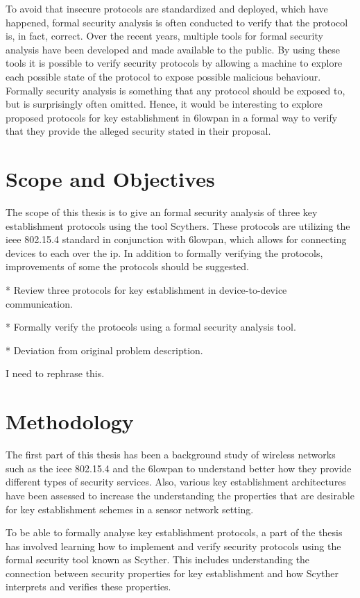 To avoid that insecure protocols are standardized and deployed, which have happened, formal security analysis is often conducted to verify that the protocol is, in fact, correct. Over the recent years, multiple tools for formal security analysis have been developed and made available to the public. By using these tools it is possible to verify security protocols by allowing a machine to explore each possible state of the protocol to expose possible malicious behaviour. Formally security analysis is something that any protocol should be exposed to, but is surprisingly often omitted. Hence, it would be interesting to explore proposed protocols for key establishment in \gls{6lowpan} in a formal way to verify that they provide the alleged security stated in their proposal.

\section{Scope and Objectives}

The scope of this thesis is to give an formal security analysis of three key establishment protocols using the tool Scythers. These protocols are utilizing the \gls{ieee} 802.15.4 standard in conjunction with \gls{6lowpan}, which allows for connecting devices to each over the \gls{ip}. In addition to formally verifying the protocols, improvements of some the protocols should be suggested. 

* Review three protocols for key establishment in device-to-device communication.

* Formally verify the protocols using a formal security analysis tool.

* Deviation from original problem description.


I need to rephrase this.

\section{Methodology}

The first part of this thesis has been a background study of wireless networks such as the \gls{ieee} 802.15.4 and the \gls{6lowpan} to understand better how they provide different types of security services. Also, various key establishment architectures have been assessed to increase the understanding the properties that are desirable for key establishment schemes in a sensor network setting.

To be able to formally analyse key establishment protocols, a part of the thesis has involved learning how to implement and verify security protocols using the formal security tool known as Scyther. This includes understanding the connection between security properties for key establishment and how Scyther interprets and verifies these properties.


